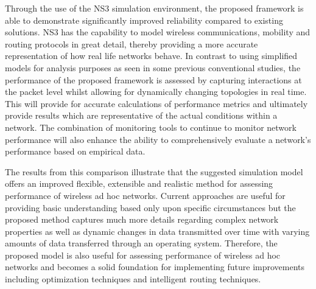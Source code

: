 \documentclass[a4paper,fleqn]{cas-dc}
\numberwithin{equation}{section}
\begin{document}
Through the use of the NS3 simulation environment, the proposed framework is able to demonstrate significantly improved reliability compared to existing solutions. NS3 has the capability to model wireless communications, mobility and routing protocols in great detail, thereby providing a more accurate representation of how real life networks behave. In contrast to using simplified models for analysis purposes as seen in some previous conventional studies, the performance of the proposed framework is assessed by capturing interactions at the packet level whilst allowing for dynamically changing topologies in real time. This will provide for accurate calculations of performance metrics and ultimately provide results which are representative of the actual conditions within a network. The combination of monitoring tools to continue to monitor network performance will also enhance the ability to comprehensively evaluate a network's performance based on empirical data.

The results from this comparison illustrate that the suggested simulation model offers an improved flexible, extensible and realistic method for assessing performance of wireless ad hoc networks. Current approaches are useful for providing basic understanding based only upon specific circumstances but the proposed method captures much more details regarding complex network properties as well as dynamic changes in data transmitted over time with varying amounts of data transferred through an operating system. Therefore, the proposed model is also useful for assessing performance of wireless ad hoc networks and becomes a solid foundation for implementing future improvements including optimization techniques and intelligent routing techniques.
\end{document}
